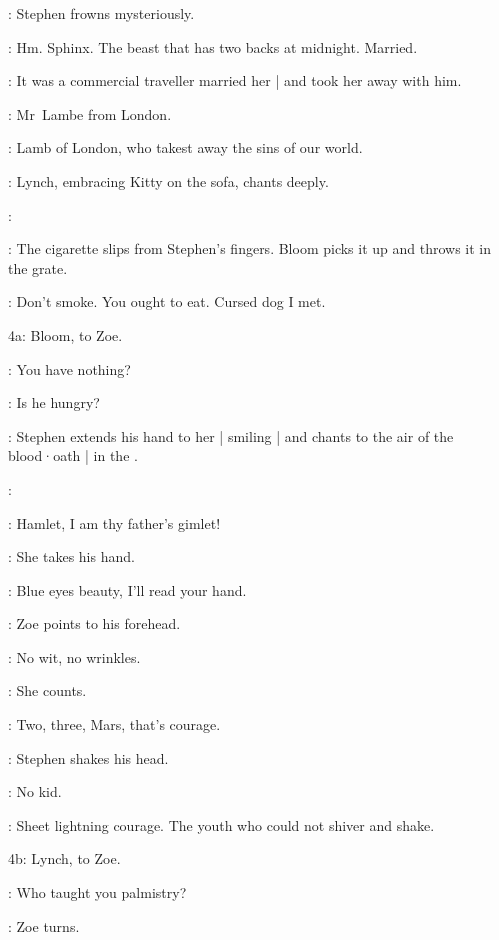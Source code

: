 :
Stephen frowns mysteriously.

\Stephen:
Hm.
Sphinx.
The beast that has two backs at midnight.
Married.

\Zoe:
It was a commercial traveller married her |
and took her away with him.

\Florry:
Mr~Lambe from London.

\Stephen:
Lamb of London,
who takest away the sins of our world.

:
Lynch,
embracing Kitty on the sofa,
chants deeply.

\Lynch:

:
The cigarette slips from Stephen's fingers.
Bloom picks it up and throws it in the grate.

\Bloom:
Don't smoke.
You ought to eat.
Cursed dog I met.

\N4a:
Bloom, to Zoe.

\Bloom:
You have nothing?

\Zoe:
Is he hungry?

:
Stephen extends his hand to her |
smiling |
and chants to the air of the blood·oath |
in the .

\Stephen:
\begin{verse}
\end{verse}

\Zoe:
Hamlet,
I am thy father's gimlet!

:
She takes his hand.

\Zoe:
Blue eyes beauty,
I'll read your hand.

:
Zoe points to his forehead.

\Zoe:
No wit,
no wrinkles.

:
She counts.

\Zoe:
Two,
three,
Mars,
that's courage.

:
Stephen shakes his head.

\Zoe:
No kid.

\Lynch:
Sheet lightning courage.
The youth who could not shiver and shake.

\N4b:
Lynch, to Zoe.

\Lynch:
Who taught you palmistry?

:
Zoe turns.

